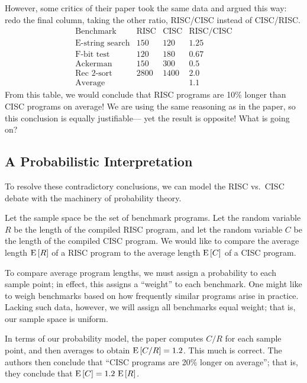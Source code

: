\documentclass[11pt,twoside]{article}
\begin{document}
However, some critics of their paper took the same data and argued this
way: redo the final column, taking the other ratio, RISC/CISC instead of
CISC/RISC.
\[
\begin{array}{lccc}
\text{Benchmark}        & \text{RISC}   & \text{CISC}   & \text{RISC/CISC}\\
\hline
\text{E-string search}  & 150           & 120           & 1.25 \\
\text{F-bit test}       & 120           & 180           & 0.67 \\
\text{Ackerman}         & 150           & 300           & 0.5 \\
\text{Rec 2-sort}       & 2800          & 1400          & 2.0 \\
\hline
\text{Average}          &               &               & 1.1
\end{array}
\]
From this table, we would conclude that RISC programs are 10\% longer
than CISC programs on average!  We are using the same reasoning as in
the paper, so this conclusion is equally justifiable--- yet the result
is opposite!  What is going on?

\subsection{A Probabilistic Interpretation}

To resolve these contradictory conclusions, we can model the RISC vs.\ CISC
debate with the machinery of probability theory.

Let the sample space be the set of benchmark programs.  Let the random
variable $R$ be the length of the compiled RISC program, and let the
random variable $C$ be the length of the compiled CISC program.  We would
like to compare the average length $\mathop{\textup{E}}\nolimits\left[R\right]$ of a RISC program to the
average length $\mathop{\textup{E}}\nolimits\left[C\right]$ of a CISC program.

To compare average program lengths, we must assign a probability to
each sample point; in effect, this assigns a ``weight'' to each
benchmark.  One might like to weigh benchmarks based on how frequently
similar programs arise in practice.  Lacking such data, however, we
will assign all benchmarks equal weight; that is, our sample space is
uniform.

In terms of our probability model, the paper computes $C / R$ for each
sample point, and then averages to obtain $\mathop{\textup{E}}\nolimits\left[C / R\right] = 1.2$.  This
much is correct.  The authors then conclude that ``CISC programs are 20\%
longer on average''; that is, they conclude that $\mathop{\textup{E}}\nolimits\left[C\right] = 1.2\,
\mathop{\textup{E}}\nolimits\left[R\right]$.
\end{document}
